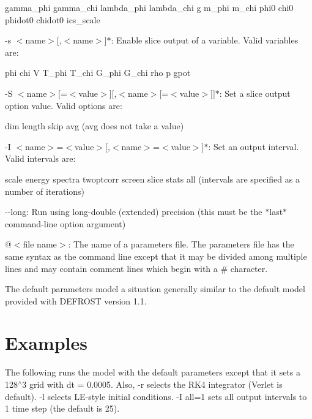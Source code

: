 \begin{DoxyItemize}
\begin{DoxyCode}
        gamma_phi
        gamma_chi
        lambda_phi
        lambda_chi
        g
        m_phi
        m_chi
        phi0
        chi0
        phidot0
        chidot0
        ics_scale
\end{DoxyCode}
 \item -\/s $<$name$>$\mbox{[},$<$name$>$\mbox{]}$\ast$: Enable slice output of a variable. Valid variables are: 
\begin{DoxyCode}
        phi
        chi
        V
        T_phi
        T_chi
        G_phi
        G_chi
        rho
        p
        gpot
\end{DoxyCode}
 \item -\/S $<$name$>$\mbox{[}=$<$value$>$\mbox{]}\mbox{[},$<$name$>$\mbox{[}=$<$value$>$\mbox{]}\mbox{]}$\ast$: Set a slice output option value. Valid options are: 
\begin{DoxyCode}
        dim
        length
        skip
        avg
        (avg does not take a value)
\end{DoxyCode}
 \item -\/I $<$name$>$=$<$value$>$\mbox{[},$<$name$>$=$<$value$>$\mbox{]}$\ast$: Set an output interval. Valid intervals are: 
\begin{DoxyCode}
        scale
        energy
        spectra
        twoptcorr
        screen
        slice
        stats
        all
        (intervals are specified as a number of iterations)
\end{DoxyCode}
 \item -\/-\/long: Run using long-\/double (extended) precision (this must be the $\ast$last$\ast$ command-\/line option argument) \item @$<$file name$>$: The name of a parameters file. The parameters file has the same syntax as the command line except that it may be divided among multiple lines and may contain comment lines which begin with a \# character.\end{DoxyItemize}
\begin{DoxyParagraph}{}
The default parameters model a situation generally similar to the default model provided with DEFROST version 1.1.
\end{DoxyParagraph}
\hypertarget{running_rexamples}{}\section{Examples}\label{running_rexamples}
The following runs the model with the default parameters except that it sets a 128$^\wedge$3 grid with dt = 0.0005. Also, -\/r selects the RK4 integrator (Verlet is default). -\/l selects LE-\/style initial conditions. -\/I all=1 sets all output intervals to 1 time step (the default is 25).



